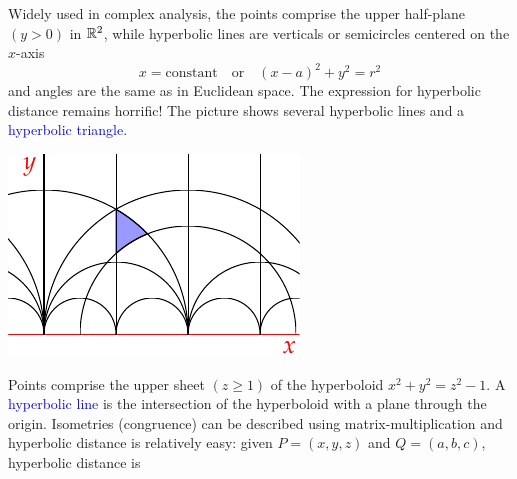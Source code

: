 \begin{minipage}[t]{0.69\linewidth}\vspace{0pt}
	
	Widely used in complex analysis, the points comprise the upper half-plane $(y>0)$ in $\mathbb{R}^2$, while hyperbolic lines are verticals or semicircles centered on the $x$-axis
	\[
		x=\text{constant}\quad\text{or}\quad (x-a)^2+y^2=r^2
	\]
	and angles are the same as in Euclidean space. The expression for hyperbolic distance remains horrific! The picture shows several hyperbolic lines and a \textcolor{blue}{hyperbolic triangle.}
\end{minipage}
\hfill
\begin{minipage}[t]{0.3\linewidth}\vspace{0pt}
	\flushright\includegraphics{models-halfplane}
\end{minipage}




Points comprise the upper sheet $(z\ge 1)$ of the hyperboloid $x^2+y^2=z^2-1$. A \textcolor{blue}{hyperbolic line} is the intersection of the hyperboloid with a plane through the origin. Isometries (congruence) can be described using matrix-multiplication and hyperbolic distance is relatively easy: given $P=(x,y,z)$ and $Q=(a,b,c)$, hyperbolic distance is

